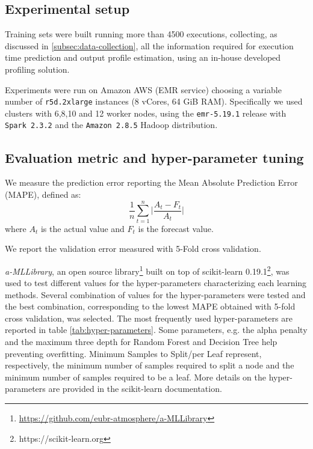 \documentclass[a4paper, 10pt, conference]{ieeeconf}      %
\begin{document}

\subsection{Experimental setup}
\label{subsec:exp-setup}
Training sets were built running more than 4500 executions, collecting, as discussed in \ref{subsec:data-collection}, all the information required for execution time prediction and output profile estimation, using an in-house developed profiling solution.

Experiments were run on Amazon AWS (EMR service) choosing a variable number of \texttt{r5d.2xlarge} instances (8 vCores, 64 GiB RAM). Specifically we used clusters with 6,8,10 and 12 worker nodes, using the \texttt{emr-5.19.1} release with \texttt{Spark 2.3.2} and the \texttt{Amazon 2.8.5} Hadoop distribution.

\subsection{Evaluation metric and hyper-parameter tuning}
\label{subsec:error-hyper}
We measure the prediction error reporting the Mean Absolute Prediction Error (MAPE), defined as:
$$ \frac{1}{n} \sum_{t=1}^n \bigg| \frac{A_t - F_t}{A_t}\bigg|$$
where $A_t$ is the actual value and $F_t$ is the forecast value.

We report the validation error measured with 5-Fold cross validation.


\textit{a-MLLibrary}, an open source  library\footnote{\url{https://github.com/eubr-atmosphere/a-MLLibrary}} built on top of scikit-learn 0.19.1\footnote{https://scikit-learn.org}, was used to test different values for the hyper-parameters characterizing each learning methods.
Several combination of values for the hyper-parameters were tested and the best combination, corresponding to the lowest MAPE obtained with 5-fold cross validation, was selected.
The most frequently used hyper-parameters are reported in table \ref{tab:hyper-parameters}. 
Some parameters, e.g. the alpha penalty and the maximum three depth for Random Forest and Decision Tree help preventing overfitting. Minimum Samples to Split/per Leaf represent, respectively, the minimum number of samples required to split a node and the minimum number of samples required to be a leaf. More details on the hyper-parameters are provided in the scikit-learn documentation.
\end{document}
